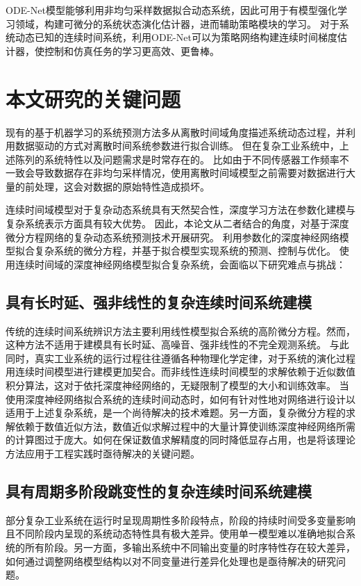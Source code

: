 ODE-Net模型能够利用非均匀采样数据拟合动态系统，因此可用于有模型强化学习\cite{Yildiz2021}领域，构建可微分的系统状态演化估计器，进而辅助策略模块的学习。
对于系统动态已知的连续时间系统，利用ODE-Net可以为策略网络构建连续时间梯度估计器\cite{Ainsworth2020}，使控制和仿真任务的学习更高效、更鲁棒。



\section{本文研究的关键问题}
\label{sec:challenge}
现有的基于机器学习的系统预测方法多从离散时间域角度描述系统动态过程，并利用数据驱动的方式对离散时间系统参数进行拟合训练。
但在复杂工业系统中，上述陈列的系统特性以及问题需求是时常存在的。
比如由于不同传感器工作频率不一致会导致数据存在非均匀采样情况，使用离散时间域模型之前需要对数据进行大量的前处理，这会对数据的原始特性造成损坏。

连续时间域模型对于复杂动态系统具有天然契合性，深度学习方法在参数化建模与复杂系统表示方面具有较大优势。
因此，本论文从二者结合的角度，对基于深度微分方程网络的复杂动态系统预测技术开展研究。
利用参数化的深度神经网络模型拟合复杂系统的微分方程，并基于拟合模型实现系统的预测、控制与优化。
使用连续时间域的深度神经网络模型拟合复杂系统，会面临以下研究难点与挑战：
\subsection{具有长时延、强非线性的复杂连续时间系统建模}
传统的连续时间系统辨识方法主要利用线性模型拟合系统的高阶微分方程。然而，这种方法不适用于建模具有长时延、高噪音、强非线性的不完全观测系统。
与此同时，真实工业系统的运行过程往往遵循各种物理化学定律，对于系统的演化过程用连续时间模型进行建模更加契合。而非线性连续时间模型的求解依赖于近似数值积分算法，这对于依托深度神经网络的，无疑限制了模型的大小和训练效率。
当使用深度神经网络拟合系统的连续时间动态时，如何有针对性地对网络进行设计以适用于上述复杂系统，是一个尚待解决的技术难题。另一方面，复杂微分方程的求解依赖于数值近似方法，数值近似求解过程中的大量计算使训练深度神经网络所需的计算图过于庞大。如何在保证数值求解精度的同时降低显存占用，也是将该理论方法应用于工程实践时亟待解决的关键问题。

\subsection{具有周期多阶段跳变性的复杂连续时间系统建模}
部分复杂工业系统在运行时呈现周期性多阶段特点，阶段的持续时间受多变量影响且不同阶段内呈现的系统动态特性具有极大差异。使用单一模型难以准确地拟合系统的所有阶段。另一方面，多输出系统中不同输出变量的时序特性存在较大差异，如何通过调整网络模型结构以对不同变量进行差异化处理也是亟待解决的研究问题。

